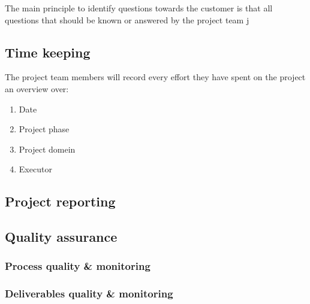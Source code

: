 The main principle to identify questions towards the customer is that all questions that should be known or answered by the project team j

\subsection{Time keeping}
The project team members will record every effort they have spent on the project an overview over:
\begin{enumerate}
	\item Date
	\item Project phase
	\item Project domein
	\item Executor
\end {enumerate}

\subsection{Project reporting}
\lipsum[1]

\subsection{Quality assurance}
\lipsum[1]

\subsubsection{Process quality \& monitoring}
\lipsum[1]

\subsubsection{Deliverables quality \& monitoring}
\lipsum[1]
